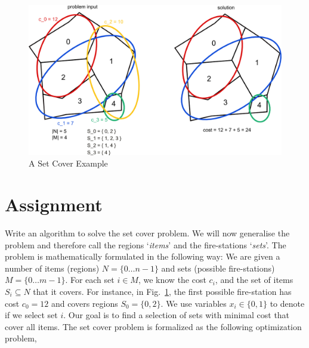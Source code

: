 \documentclass[11pt]{article}
\begin{document}
\begin{figure}[h]
        \centering
        \includegraphics[width=14.0cm]{figures/setCover.png}
\caption{A Set Cover Example}\label{fig:graph}
\end{figure}

\section{Assignment}

Write an algorithm to solve the set cover problem. We will now generalise the problem 
and therefore call the regions `{\em items}' and the fire-stations `{\em sets}'. 
The problem is mathematically formulated 
in the following way: We are given a number of items (regions) $N = \{0 \dots n-1\}$ and  
sets (possible fire-stations) $M = \{0 \dots m-1\}$. 
For each set $i \in M$, we know the cost $c_i$, and the set of items $S_i \subseteq N$ that 
it covers. For instance,
in Fig.~\ref{fig:graph}, the first possible fire-station has cost $c_0 = 12$ and covers 
regions $S_0 = \{0,2\}$.
We use variables $x_i \in \{0,1\}$ to denote if we select set $i$. Our goal is to find a
selection of sets with minimal cost that cover all items. 
The set cover problem is formalized as the following optimization problem,
\end{document}
